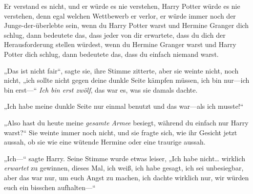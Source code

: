 Er verstand es nicht, und er würde es nie verstehen, Harry Potter würde es nie verstehen, denn egal welchen Wettbewerb er verlor, er würde immer noch der Junge-der-überlebte sein, wenn du Harry Potter warst und Hermine Granger dich schlug, dann bedeutete das, dass jeder von dir erwartete, dass du dich der Herausforderung stellen würdest, wenn du Hermine Granger warst und Harry Potter dich schlug, dann bedeutete das, dass du einfach niemand warst.

„Das ist nicht fair“, sagte sie, ihre Stimme zitterte, aber sie weinte nicht, noch nicht, „ich sollte nicht gegen deine dunkle Seite kämpfen müssen, ich bin nur—ich bin erst—“ \emph{Ich bin erst zwölf}, das war es, was sie damals dachte.%

„Ich habe meine dunkle Seite nur einmal benutzt und das war—als ich musste!“

„Also hast du heute meine \emph{gesamte} \emph{Armee} besiegt, während du einfach nur Harry warst?“ Sie weinte immer noch nicht, und sie fragte sich, wie ihr Gesicht jetzt aussah, ob sie wie eine wütende Hermine oder eine traurige aussah.

„Ich—“ sagte Harry. Seine Stimme wurde etwas leiser, „Ich habe nicht… wirklich \emph{erwartet} zu gewinnen, dieses Mal, ich weiß, ich habe gesagt, ich sei unbesiegbar, aber das war nur, um euch Angst zu machen, ich dachte wirklich nur, wir würden euch ein bisschen aufhalten—“

